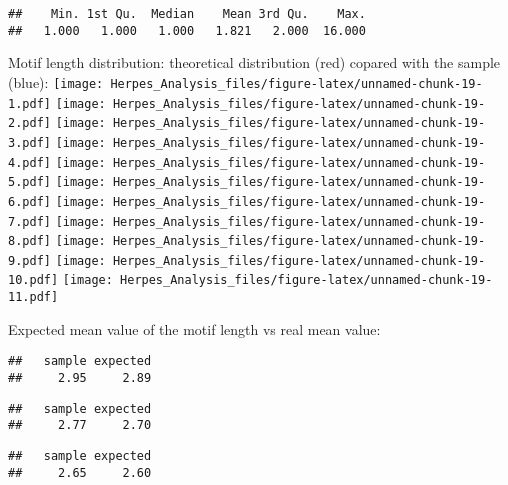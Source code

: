 \documentclass[
]{article}
\newenvironment{Shaded}{\begin{snugshade}}{\end{snugshade}}
\newcommand{\ControlFlowTok}[1]{\textcolor[rgb]{0.13,0.29,0.53}{\textbf{#1}}}
\newcommand{\DataTypeTok}[1]{\textcolor[rgb]{0.13,0.29,0.53}{#1}}
\newcommand{\DecValTok}[1]{\textcolor[rgb]{0.00,0.00,0.81}{#1}}
\newcommand{\KeywordTok}[1]{\textcolor[rgb]{0.13,0.29,0.53}{\textbf{#1}}}
\newcommand{\NormalTok}[1]{#1}
\newcommand{\OperatorTok}[1]{\textcolor[rgb]{0.81,0.36,0.00}{\textbf{#1}}}
\newcommand{\StringTok}[1]{\textcolor[rgb]{0.31,0.60,0.02}{#1}}
\begin{document}
\begin{verbatim}
##    Min. 1st Qu.  Median    Mean 3rd Qu.    Max. 
##   1.000   1.000   1.000   1.821   2.000  16.000
\end{verbatim}

Motif length distribution: theoretical distribution (red) copared with
the sample (blue):
\texttt{[image: Herpes\_Analysis\_files/figure-latex/unnamed-chunk-19-1.pdf]}
\texttt{[image: Herpes\_Analysis\_files/figure-latex/unnamed-chunk-19-2.pdf]}
\texttt{[image: Herpes\_Analysis\_files/figure-latex/unnamed-chunk-19-3.pdf]}
\texttt{[image: Herpes\_Analysis\_files/figure-latex/unnamed-chunk-19-4.pdf]}
\texttt{[image: Herpes\_Analysis\_files/figure-latex/unnamed-chunk-19-5.pdf]}
\texttt{[image: Herpes\_Analysis\_files/figure-latex/unnamed-chunk-19-6.pdf]}
\texttt{[image: Herpes\_Analysis\_files/figure-latex/unnamed-chunk-19-7.pdf]}
\texttt{[image: Herpes\_Analysis\_files/figure-latex/unnamed-chunk-19-8.pdf]}
\texttt{[image: Herpes\_Analysis\_files/figure-latex/unnamed-chunk-19-9.pdf]}
\texttt{[image: Herpes\_Analysis\_files/figure-latex/unnamed-chunk-19-10.pdf]}
\texttt{[image: Herpes\_Analysis\_files/figure-latex/unnamed-chunk-19-11.pdf]}

Expected mean value of the motif length vs real mean value:

\begin{verbatim}
##   sample expected 
##     2.95     2.89
\end{verbatim}

\begin{verbatim}
##   sample expected 
##     2.77     2.70
\end{verbatim}

\begin{verbatim}
##   sample expected 
##     2.65     2.60
\end{verbatim}

\begin{Shaded}
\end{Shaded}
\end{document}
